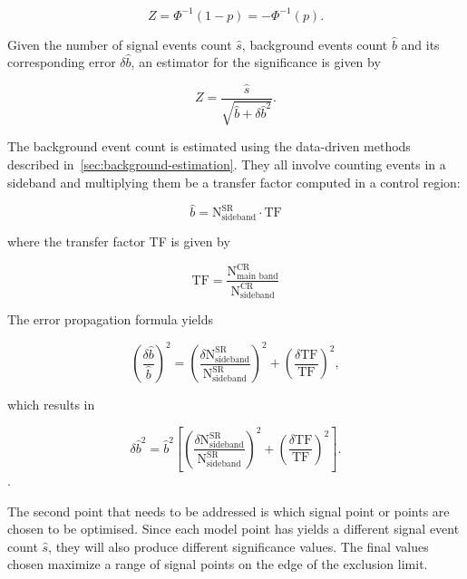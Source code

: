 \begin{equation}
Z = \Phi^{-1}(1-p)=-\Phi^{-1}(p).
\end{equation}

Given the number of signal events count $\hat{s}$, background events count $\hat{b}$ and its corresponding error $\delta \hat{b}$, an estimator for the significance is given by

\begin{equation}
Z = \frac{\hat{s}}{\sqrt{\hat{b}+\delta \hat{b}^2}}.
\end{equation}

The background event count is estimated using the data-driven methods described in~\ref{sec:background-estimation}. They all involve counting events in a sideband and multiplying them be a transfer factor computed in a control region:

\begin{equation}
\hat{b} = \mathrm{N}^{\mathrm{SR}}_{\text{sideband}}\cdot \mathrm{TF}
\end{equation}

where the transfer factor TF is given by 

\begin{equation}
\mathrm{TF}=\frac{\mathrm{N}^{\mathrm{CR}}_{\text{main band}}}{\mathrm{N}^{\mathrm{CR}}_{\text{sideband}}}
\end{equation}

The error propagation formula yields

\begin{equation}
\left( \frac{\delta \hat{b}}{\hat{b}}  \right)^2=\left( \frac{\delta \mathrm{N}^{\mathrm{SR}}_{\text{sideband}}}{\mathrm{N}^{\mathrm{SR}}_{\text{sideband}}}  \right)^2 + \left( \frac{\delta \mathrm{TF}}{\mathrm{TF}}  \right)^2,
\end{equation}

which results in

\begin{equation}
\delta \hat{b}^2=\hat{b}^2 \left[ \left( \frac{\delta \mathrm{N}^{\mathrm{SR}}_{\text{sideband}}}{\mathrm{N}^{\mathrm{SR}}_{\text{sideband}}}  \right)^2 + \left( \frac{\delta \mathrm{TF}}{\mathrm{TF}}  \right)^2 \right] .
\end{equation}.

The second point that needs to be addressed is which signal point or points are chosen to be optimised. Since each model point has yields a different signal event count $\hat{s}$, they will also produce different significance values. The final values chosen maximize a range of signal points on the edge of the exclusion limit. 

